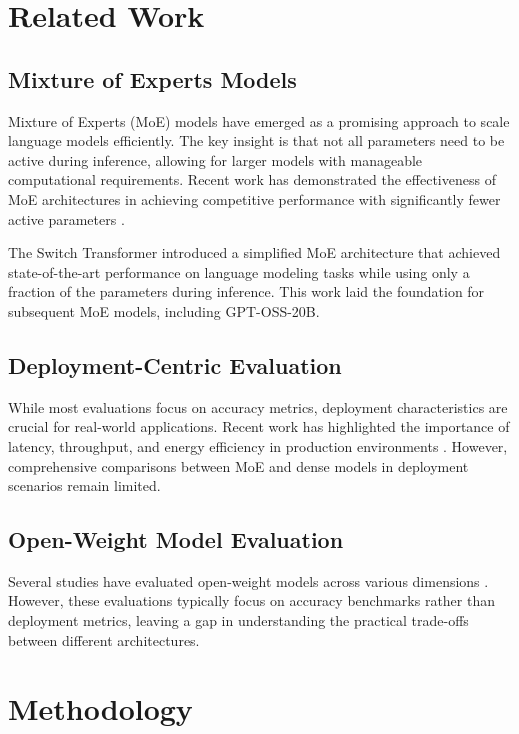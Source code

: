 \documentclass[11pt]{article}
\begin{document}
\section{Related Work}

\subsection{Mixture of Experts Models}

Mixture of Experts (MoE) models have emerged as a promising approach to scale language models efficiently. The key insight is that not all parameters need to be active during inference, allowing for larger models with manageable computational requirements. Recent work has demonstrated the effectiveness of MoE architectures in achieving competitive performance with significantly fewer active parameters \cite{shazeer2017outrageously, lepikhin2020gshard, fedus2021switch}.

The Switch Transformer \cite{fedus2021switch} introduced a simplified MoE architecture that achieved state-of-the-art performance on language modeling tasks while using only a fraction of the parameters during inference. This work laid the foundation for subsequent MoE models, including GPT-OSS-20B.

\subsection{Deployment-Centric Evaluation}

While most evaluations focus on accuracy metrics, deployment characteristics are crucial for real-world applications. Recent work has highlighted the importance of latency, throughput, and energy efficiency in production environments \cite{liu2023survey, wang2023survey}. However, comprehensive comparisons between MoE and dense models in deployment scenarios remain limited.

\subsection{Open-Weight Model Evaluation}

Several studies have evaluated open-weight models across various dimensions \cite{jiang2023mistral, team2024qwen, ai2024yi}. However, these evaluations typically focus on accuracy benchmarks rather than deployment metrics, leaving a gap in understanding the practical trade-offs between different architectures.

\section{Methodology}
\end{document}
